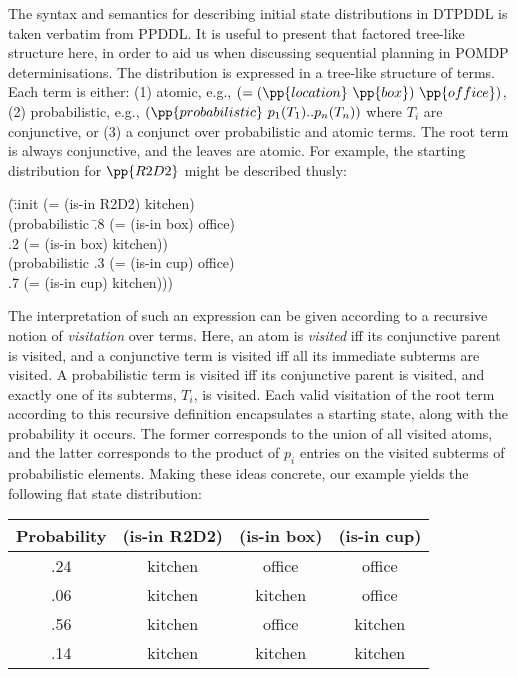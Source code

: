 The syntax and semantics for describing initial state distributions in
DTPDDL is taken verbatim from PPDDL. It is useful to present that
factored tree-like structure here, in order to aid us when discussing
sequential planning in POMDP determinisations. The distribution is
expressed in a tree-like structure of terms. Each term is either: (1)
atomic, e.g., $(=(\pp{location}~\pp{box})~\pp{office})$, (2)
probabilistic, e.g., $(\pp{probabilistic}~p_1 (T_1) .. p_n (T_n))$
where $T_i$ are conjunctive, or (3) a conjunct over probabilistic and
atomic terms. The root term is always conjunctive, and the leaves are
atomic. For example, the starting distribution for $\pp{R2D2}$ might
be described thusly:

\small
\begin{tabtt}
(\=:init (= (is-in R2D2) kitchen) \+ \\
       (probabilistic \=.8 (= (is-in box) office)  \\
		      \>.2 (= (is-in box) kitchen)) \\
       (probabilistic .3 (= (is-in cup) office)  \\
		      \>.7 (= (is-in cup) kitchen))) \\
\end{tabtt}
\normalsize


\noindent The interpretation of such an expression can be given
according to a recursive notion of {\em visitation} over terms. Here,
an atom is {\em visited} iff its conjunctive parent is visited, and a
conjunctive term is visited iff all its immediate subterms are
visited. A probabilistic term is visited iff its conjunctive parent is
visited, and exactly one of its subterms, $T_i$, is visited. Each
valid visitation of the root term according to this recursive
definition encapsulates a starting state, along with the probability
it occurs. The former corresponds to the union of all visited atoms,
and the latter corresponds to the product of $p_i$ entries on the
visited subterms of probabilistic elements. Making these ideas
concrete, our example yields the following flat state distribution:


\small
\begin{tabular}{cccc}
\hline
Probability & (is-in R2D2)  & (is-in box)  & (is-in cup) \\
\hline
.24 & kitchen & office & office \\
.06 & kitchen & kitchen & office \\
.56 & kitchen & office & kitchen \\
.14 & kitchen & kitchen & kitchen \\
\hline
\end{tabular}
\normalsize
